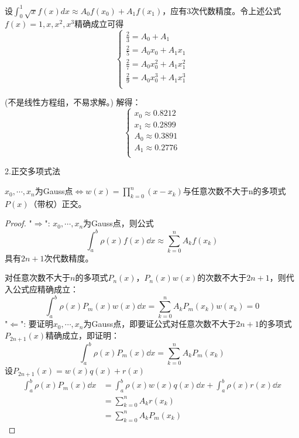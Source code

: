 \begin{solution}
    设$\int_{0}^{1}\sqrt{x}f(x)dx \approx A_0f(x_0)+A_1f(x_1)$，应有3次代数精度。令上述公式$f(x) = 1,x,x^2,x^3$精确成立可得
    \begin{equation*}
        \begin{cases}
            \frac{2}{3} = A_0 + A_1\\
            \frac{2}{5} = A_0x_0 + A_1x_1\\
            \frac{2}{7} = A_0x_0^2 + A_1x_1^2\\
            \frac{2}{9} = A_0x_0^3 + A_1x_1^3\\
        \end{cases}
    \end{equation*}
    
    (不是线性方程组，不易求解。)
    解得：
    \begin{equation*}
        \begin{cases}
            x_0 \approx 0.8212\\
            x_1 \approx 0.2899\\
            A_0 \approx 0.3891\\
            A_1 \approx 0.2776\\
        \end{cases}
    \end{equation*}
\end{solution}

2.正交多项式法
\begin{theorem}
    $x_0,\cdots,x_n$为Gauss点$\Leftrightarrow w(x) = \prod_{k=0}^{n}(x-x_k)$与任意次数不大于n的多项式$P(x)$（带权）正交。
\end{theorem}
\begin{proof}
    "$\Rightarrow$":
    $x_0,\cdots,x_n$为Gauss点，则公式
    \begin{equation*}
        \int_{a}^{b}\rho(x)f(x)\dd{x}\approx \sum_{k=0}^{n}A_kf(x_k)
    \end{equation*}
    具有$2n+1$次代数精度。

    对任意次数不大于$n$的多项式$P_n(x)$，$P_n(x)w(x)$的次数不大于$2n+1$，则代入公式应精确成立：
    \begin{equation*}
        \int_{a}^{b}\rho(x)P_m(x)w(x)\dd{x} = \sum_{k=0}^{n}A_kP_m(x_k)w(x_k) = 0
    \end{equation*}
    "$\Leftarrow$":
    要证明$x_0,\cdots,x_n$为Gauss点，即要证公式对任意次数不大于$2n+1$的多项式$P_{2n+1}(x)$精确成立，即证明：
    \begin{equation*}
        \int_{a}^{b}\rho(x)P_m(x)\dd{x} = \sum_{k=0}^{n}A_kP_m(x_k)
    \end{equation*}
    设$P_{2n+1}(x) = w(x)q(x)+r(x)$
    \begin{align*}
        \int_{a}^{b}\rho(x)P_m(x)\dd{x} &= \int_{a}^{b}\rho(x)w(x)q(x)\dd{x} + \int_{a}^{b}\rho(x)r(x)\dd{x} \\
        &= \sum_{k=0}^{n}A_kr(x_k) \\
        &= \sum_{k=0}^{n}A_kP_m(x_k)
    \end{align*}
\end{proof}

